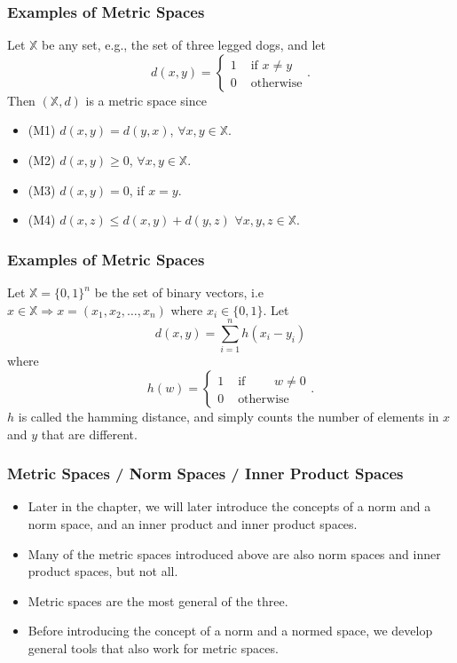 \documentclass{beamer}
\begin{document}
\begin{frame}\frametitle{Examples of Metric Spaces}

\begin{example}

Let $\mathbb{X}$ be any set, e.g., the set of three legged dogs, and let
\[
d(x,y) = \begin{cases}
 1 & \text{~if~} x\neq y \\
 0 & \text{~otherwise}	
 \end{cases}.
 \]
 Then $(\mathbb{X}, d)$ is a metric space since
\begin{itemize}
	\item (M1) $d(x,y) = d(y,x)$, $\forall x,y \in \mathbb{X}$.
	\item (M2) $d(x,y) \geq 0$, $\forall x,y \in \mathbb{X}$.	
	\item (M3) $d(x,y) = 0$, if $x=y$.	
	\item (M4) $d(x,z)\leq d(x,y) + d(y,z)$ $\forall x,y,z \in \mathbb{X}$. 
\end{itemize}
\end{example}
\end{frame}

\begin{frame}\frametitle{Examples of Metric Spaces}

\begin{example}

Let $\mathbb{X}=\{0,1\}^n$ be the set of binary vectors, i.e \\
$x\in\mathbb{X} \Rightarrow x=(x_1, x_2, \dots, x_n)$ where $x_i\in \{0, 1\}$.
Let 
\[ 
d(x,y) = \sum_{i=1}^{n}{h(x_i - y_i)} 
\]  
where
\[ 
h(w) = \begin{cases} 
	1 & \text{ if } \qquad w \neq 0 \\ 
	0 & \text{ otherwise }
\end{cases}.
\]
$h$ is called the hamming distance, and simply counts the number of elements in $x$ and $y$ that are different.
\end{example}
\end{frame}

\begin{frame}\frametitle{Metric Spaces / Norm Spaces / Inner Product Spaces}

\begin{itemize}
\item Later in the chapter, 	we will later introduce the concepts of a norm and a norm space, and an inner product and inner product spaces.
\item Many of the metric spaces introduced above are also norm spaces and inner product spaces, but not all.  
\item Metric spaces are the most general of the three.  
\item Before introducing the concept of a norm and a normed space, we develop general tools that also work for metric spaces.
\end{itemize}
\end{frame}
\end{document}

